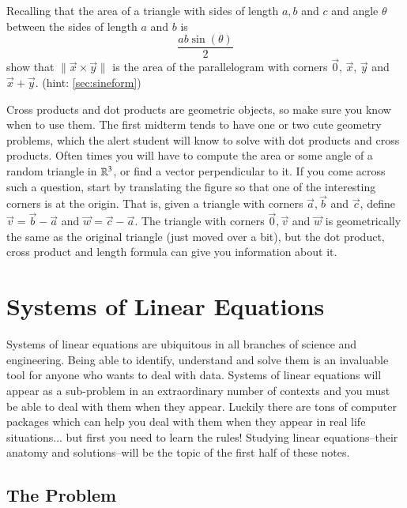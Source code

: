 \documentclass[Main.tex]{subfiles}
\begin{document}
\begin{EasyEx}
  \label{sec:crossprodisarea}
  Recalling that the area of a triangle with sides of length $a,b$ and $c$ and angle $\theta$ between the sides of length $a$ and $b$ is
  \[\frac{ab\sin(\theta)}{2}\]
  show that $\|\vec{x}\times\vec{y}\|$ is the area of the parallelogram with corners $\vec{0}$, $\vec{x}$, $\vec{y}$ and $\vec{x}+\vec{y}$.
  (hint: \ref{sec:sineform})
\end{EasyEx}

\begin{Remark}
  Cross products and dot products are geometric objects, so make sure you know when to use them.  
  The first midterm tends to have one or two cute geometry problems, which the alert student will know to solve with dot products and cross products.
  Often times you will have to compute the area or some angle of a random triangle in $\mathbb{R}^3$, or find a vector perpendicular to it.
  If you come across such a question, start by translating the figure so that one of the interesting corners is at the origin.
  That is, given a triangle with corners $\vec{a},\vec{b}$ and $\vec{c}$, define $\vec{v}=\vec{b}-\vec{a}$ and $\vec{w}=\vec{c}-\vec{a}$.
  The triangle with corners $\vec{0},\vec{v}$ and $\vec{w}$ is geometrically the same as the original triangle (just moved over a bit), 
  but the dot product, cross product and length formula can give you information about it.
\end{Remark}
  

\exersisesd

\section{Systems of Linear Equations}

Systems of linear equations are ubiquitous in all branches of science and engineering.
Being able to identify, understand and solve them is an invaluable tool for anyone who wants to deal with data.
Systems of linear equations will appear as a sub-problem in an extraordinary number of contexts and you must be able to deal with them when they appear.
Luckily there are tons of computer packages which can help you deal with them when they appear in real life situations... but first you need to learn the rules!
Studying linear equations--their anatomy and solutions--will be the topic of the first half of these notes.

\subsection{The Problem}
\end{document}
